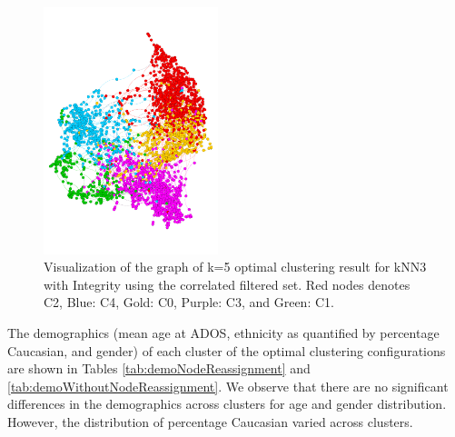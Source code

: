 \documentclass{bmcart}
\begin{document}
\begin{figure}
    \centering
\includegraphics[width=2in]{Int3-5Cor8OrigForceAtlas.pdf}

\caption[]{Visualization of the graph of k=5 optimal clustering result for kNN3 with Integrity using the correlated filtered set. Red nodes denotes C2, Blue: C4, Gold: C0, Purple: C3, and Green: C1.}
\label{fig:Int35Cor8}
\end{figure}




The demographics (mean age at ADOS, ethnicity as quantified by percentage Caucasian, and gender) of each cluster of the optimal clustering configurations are shown in Tables \ref{tab:demoNodeReassignment} and \ref{tab:demoWithoutNodeReassignment}. We observe that there are no significant differences in the demographics across clusters for age and gender distribution. However, the distribution of percentage Caucasian varied across clusters.



\begin{table}[t]
  \caption{Demographics per cluster configuration with node reassignment}
  \label{tab:demoNodeReassignment}
  \centering
\end{table} 
\end{document}
